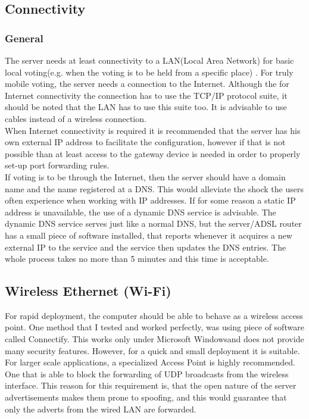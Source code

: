 \documentclass[11pt,twoside,a4paper]{book}
\begin{document}
\subsection{Connectivity}
\subsubsection{General}
The server needs at least connectivity to a LAN(Local Area Network) for basic local voting(e.g. when the voting is to be held from a specific place) . For truly mobile voting, the server needs a connection to the Internet. Although the for Internet connectivity the connection has to use the TCP/IP protocol  suite, it should be noted that the LAN has to use this suite too. It is advisable to use cables instead of a wireless connection. \\
When Internet connectivity is required it is recommended that the server has his own external IP address to facilitate the configuration, however if that is not possible than at least access to the gateway device is needed in order to properly set-up port forwarding rules.
\\
If voting is to be through the Internet, then the server should have a domain name and the name registered at a DNS. This would alleviate the shock the users often experience when working with IP addresses. If for some reason a static IP address is unavailable, the use of a dynamic DNS service is advisable. The dynamic DNS service serves just like a normal DNS, but the server/ADSL router has a small piece of software installed, that reports whenever it acquires a new external IP to the service and the service then updates the DNS entries. The whole process takes no more than 5 minutes and this time is acceptable.
\\
\subsection{Wireless Ethernet (Wi-Fi)}
For rapid deployment, the computer should be able to behave as a wireless access point. One method that I tested and worked perfectly, was using piece of software called Connectify. This works only under Microsoft \textregistered Windows\textregistered and does not provide many security features. However, for a quick and small deployment it is suitable. \\
For larger scale applications, a specialized Access Point is highly recommended. One that is able to block  the forwarding of UDP broadcasts from the wireless interface. This reason for this requirement is, that the open nature of the server advertisements makes them prone to spoofing, and this would guarantee that only the adverts from the wired LAN are forwarded.  
\end{document}
